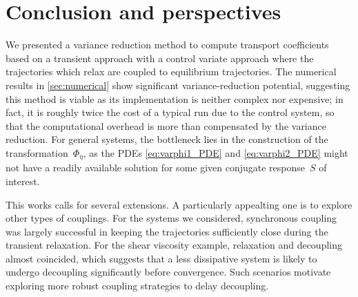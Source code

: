 \section{Conclusion and perspectives}
\label{sec:conclusion}
%
We presented a variance reduction method to compute transport coefficients based on a transient approach with a control variate approach where the trajectories which relax are coupled to equilibrium trajectories. The numerical results in \cref{sec:numerical} show significant variance-reduction potential, suggesting this method is viable as its implementation is neither complex nor expensive; in fact, it is roughly twice the cost of a typical run due to the control system, so that the computational overhead is more than compensated by the variance reduction. For general systems, the bottleneck lies in the construction of the transformation~$\Phi_\eta$, as the PDEs \eqref{eq:varphi1_PDE} and \eqref{eq:varphi2_PDE} might not have a readily available solution for some given conjugate response~$S$ of interest. 

This works calls for several extensions. A particularly appealting one is to explore other types of couplings. For the systems we considered, synchronous coupling was largely successful in keeping the trajectories sufficiently close during the transient relaxation. For the shear viscosity example, relaxation and decoupling almost coincided, which suggests that a less dissipative system is likely to undergo decoupling significantly before convergence. Such scenarios motivate exploring more robust coupling strategies to delay decoupling.

